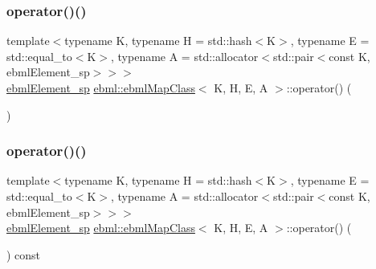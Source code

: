 \mbox{\label{classebml_1_1ebmlMapClass_adb3af4252af74bdd8ed824faad06ce55}} 
\subsubsection{\texorpdfstring{operator()()}{operator()()}\hspace{0.1cm}{\footnotesize\ttfamily [4/12]}}
{\footnotesize\ttfamily template$<$typename K, typename H = std\+::hash$<$\+K$>$, typename E = std\+::equal\+\_\+to$<$\+K$>$, typename A = std\+::allocator$<$std\+::pair$<$const K, ebml\+Element\+\_\+sp$>$$>$$>$ \\
\mbox{\hyperlink{namespaceebml_adad533b7705a16bb360fe56380c5e7be}{ebml\+Element\+\_\+sp}} \mbox{\hyperlink{classebml_1_1ebmlMapClass}{ebml\+::ebml\+Map\+Class}}$<$ K, H, E, A $>$\+::operator() (\begin{DoxyParamCaption}{ }\end{DoxyParamCaption})}

\mbox{\label{classebml_1_1ebmlMapClass_a7dad33b823f99c48ea91bf28709edaf4}} 
\subsubsection{\texorpdfstring{operator()()}{operator()()}\hspace{0.1cm}{\footnotesize\ttfamily [5/12]}}
{\footnotesize\ttfamily template$<$typename K, typename H = std\+::hash$<$\+K$>$, typename E = std\+::equal\+\_\+to$<$\+K$>$, typename A = std\+::allocator$<$std\+::pair$<$const K, ebml\+Element\+\_\+sp$>$$>$$>$ \\
\mbox{\hyperlink{namespaceebml_adad533b7705a16bb360fe56380c5e7be}{ebml\+Element\+\_\+sp}} \mbox{\hyperlink{classebml_1_1ebmlMapClass}{ebml\+::ebml\+Map\+Class}}$<$ K, H, E, A $>$\+::operator() (\begin{DoxyParamCaption}\item[{const std\+::list$<$ \mbox{\hyperlink{namespaceebml_adad533b7705a16bb360fe56380c5e7be}{ebml\+Element\+\_\+sp}} $>$ \&}]{ }\end{DoxyParamCaption}) const}

